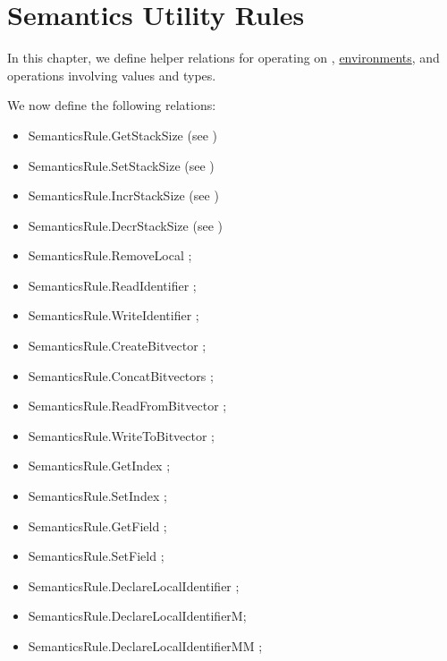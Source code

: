 \chapter{Semantics Utility Rules\label{chap:SemanticsUtilityRules}}

In this chapter, we define helper relations for operating on \nativevalues,
\hyperlink{def-envs}{environments}, and operations involving values and types.

We now define the following relations:
\begin{itemize}
  \item SemanticsRule.GetStackSize (see )
  \item SemanticsRule.SetStackSize (see )
  \item SemanticsRule.IncrStackSize (see )
  \item SemanticsRule.DecrStackSize (see )
  \item SemanticsRule.RemoveLocal ;
  \item SemanticsRule.ReadIdentifier ;
  \item SemanticsRule.WriteIdentifier ;
  \item SemanticsRule.CreateBitvector ;
  \item SemanticsRule.ConcatBitvectors ;
  \item SemanticsRule.ReadFromBitvector ;
  \item SemanticsRule.WriteToBitvector ;
  \item SemanticsRule.GetIndex ;
  \item SemanticsRule.SetIndex ;
  \item SemanticsRule.GetField ;
  \item SemanticsRule.SetField ;
  \item SemanticsRule.DeclareLocalIdentifier ;
  \item SemanticsRule.DeclareLocalIdentifierM;
  \item SemanticsRule.DeclareLocalIdentifierMM ;
\end{itemize}

